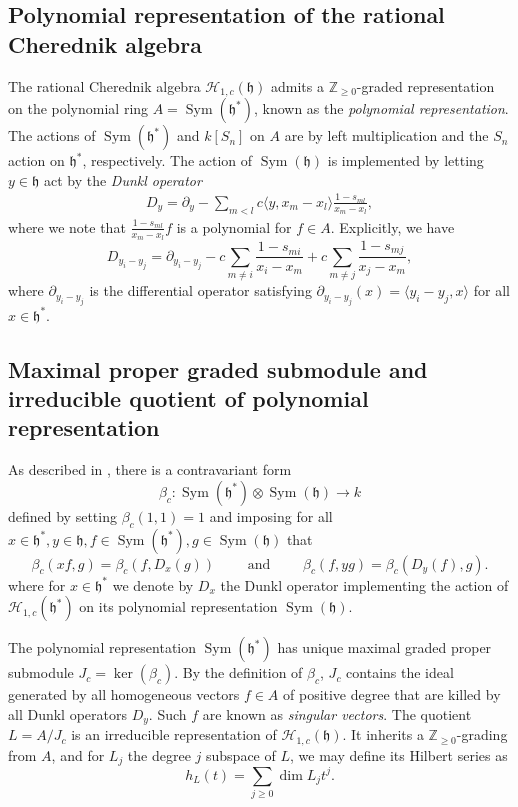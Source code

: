 \documentclass{elsarticle}
\numberwithin{equation}{section}
\theoremstyle{definition}
\newcommand{\ZZ}{\mathbb{Z}}
\newcommand{\h}{\mathfrak{h}}
\newcommand{\HH}{\mathcal{H}}
\newcommand{\Sym}{\operatorname{Sym}}
\begin{document}
\subsection{Polynomial representation of the rational Cherednik algebra}

The rational Cherednik algebra $\HH_{1, c}(\h)$ admits a $\ZZ_{\geq 0}$-graded representation on the polynomial ring $A = \Sym(\h^*)$, known as the \textit{polynomial representation}.  The actions of $\Sym(\h^*)$ and $k[S_n]$ on $A$ are by left multiplication and the $S_n$ action on $\h^*$, respectively.  The action of $\Sym(\h)$ is implemented by letting $y \in \h$ act by the \textit{Dunkl operator}
\begin{align*}
D_y =  \partial_y  - \sum_{m < l} c  \langle y, x_m-x_l \rangle \frac{1-s_{ml}}{x_m - x_l},
\end{align*}
where we note that $\frac{1-s_{ml}}{x_m - x_l}f$ is a polynomial for $f \in A$. Explicitly, we have  
\[
D_{y_i - y_j} =  \partial_{y_i-y_j}-c\sum_{m \ne i} \frac{1-s_{mi}}{x_i-x_m}+c\sum_{m \ne j} \frac{1-s_{mj}}{x_j-x_m},
\] \noindent
where $\partial_{y_i-y_j}$ is the differential operator satisfying $\partial_{y_i-y_j}(x) = \langle y_i-y_j,x\rangle$ for all $x \in \h^*$.  

\subsection{Maximal proper graded submodule and irreducible quotient of polynomial representation}

As described in \cite[Section 2.5]{BC1}, there is a contravariant form 
\[
\beta_c: \Sym(\h^*) \otimes \Sym(\h) \to k
\]
defined by setting $\beta_c(1, 1) = 1$ and imposing for all $x \in \h^*, y \in \h, f \in \Sym(\h^*), g \in \Sym(\h)$ that
\[
\beta_c(xf,g)=\beta_c(f,D_x(g)) \qquad \text{ and } \qquad \beta_c(f,yg) = \beta_c(D_y(f),g).
\]
where for $x \in \h^*$ we denote by $D_x$ the Dunkl operator implementing the action of $\HH_{1, c}(\h^*)$ on its polynomial representation $\Sym(\h)$. 

The polynomial representation $\Sym(\h^*)$ has unique maximal graded proper submodule $J_c = \ker(\beta_c)$.  By the definition of $\beta_c$, $J_c$ contains the ideal generated by all homogeneous vectors $f \in A$ of positive degree that are killed by all Dunkl operators $D_y$.  Such $f$ are known as \textit{singular vectors}.  The quotient $L = A/J_c$ is an irreducible representation of $\HH_{1,c}(\h)$.  It inherits a $\ZZ_{\geq 0}$-grading from $A$, and for $L_j$ the degree $j$ subspace of $L$, we may define its Hilbert series as
\[
h_L(t) = \sum_{j \geq 0} \dim L_j t^j.
\]
\end{document}
